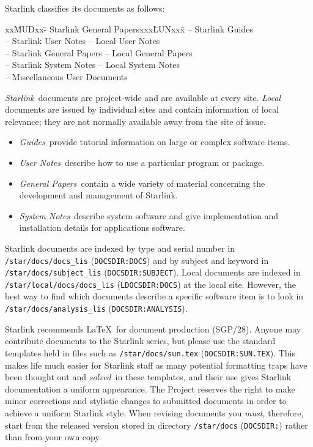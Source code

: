 Starlink classifies its documents as follows:
{\small
\begin{tabbing}
xx\=MUDxx\=- Starlink General Papersxxx\=LUNxx\=x\kill
{}\>-- Starlink Guides\\
\>-- Starlink User Notes     \>-- Local User Notes\\
\>-- Starlink General Papers \>-- Local General Papers\\
\>-- Starlink System Notes   \>-- Local System Notes\\
\>-- Miscellaneous User Documents
\end{tabbing}
}
{\em Starlink}\, documents are project-wide and are available at every site.
{\em Local}\, documents are issued by individual sites and contain information
of local relevance; they are not normally available away from the site of issue.
\begin{itemize}
\item {\em Guides}\, provide tutorial information on large or complex software
 items.
\item {\em User Notes}\, describe how to use a particular program or package.
\item {\em General Papers}\, contain a wide variety of material concerning the
development and management of Starlink.
\item {\em System Notes}\, describe system software and give implementation and
installation details for applications software.
\end{itemize}
Starlink documents are indexed by type and serial number in
{\tt /star/\-docs/\-docs\_lis} ({\tt DOCSDIR:\-DOCS}) and by subject and keyword in
{\tt /star/\-docs/\-subject\_lis} ({\tt DOCSDIR:\-SUBJECT}).
Local documents are indexed in {\tt /star/\-local/\-docs/\-docs\_lis}
({\tt LDOCSDIR:\-DOCS}) at the local site.
However, the best way to find which documents describe a specific software item
is to look in {\tt /star/\-docs/\-analysis\_lis} ({\tt DOCSDIR:\-ANALYSIS}).

Starlink recommends \LaTeX\ for document production (SGP/28).
Anyone may contribute documents to the Starlink series, but please use the
standard templates held in files such as {\tt /star/\-docs/\-sun.tex}
({\tt DOCSDIR:\-SUN.TEX}).
This makes life much easier for Starlink staff as many potential formatting
traps have been thought out and {\em solved}\, in these templates, and their use
gives Starlink documentation a uniform appearance.
The Project reserves the right to make minor corrections and stylistic changes
to submitted documents in order to achieve a uniform Starlink style.
When revising documents you {\em must,} therefore, start from the released
version stored in directory {\tt /star/\-docs} ({\tt DOCSDIR:}) rather than from
your own copy.

